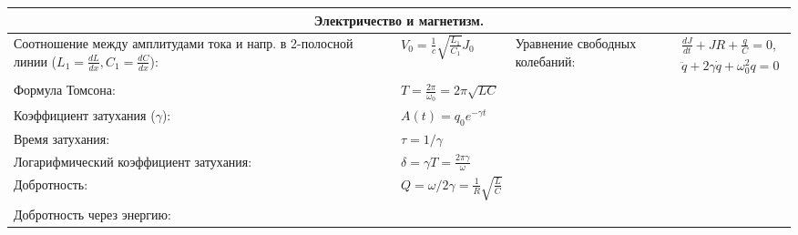 \documentclass{article}
\begin{document}
\begin{tabular}{ |p{6cm}|p{3cm}|p{6cm}|p{3.5cm}|  }
\hline
\multicolumn{4}{|c|}{Электричество и магнетизм.} \\
\hline
Соотношение между амплитудами тока и напр. в 2-полосной линии ($L_1 = \frac{d{L}}{d{x}}, C_1 = \frac{d{C}}{d{x}}$): &
$V_{0}=\frac{1}{c} \sqrt{\frac{L_{1}}{C_{1}}} J_{0}$                       &
Уравнение свободных колебаний:                                             &
$\begin{aligned}
 \frac{d J}{d t}+J R+\frac{q}{C}=0,\\
\ddot{q}+2 \gamma \dot{q}+\omega_{0}^{2} q=0
\end{aligned}$                                                             \\
\hline
Формула Томсона:                                                           &
$T=\frac{2 \pi}{\omega_{0}}=2 \pi \sqrt{L C}$                              &
                                                                           &
                                                                           \\
\hline
Коэффициент затухания ($\gamma$):                                          &
$A(t)=q_{0} e^{-\gamma t}$                                                 &
                                                                           &
                                                                           \\
\hline
Время затухания:                                                           &
$\tau=1 / \gamma$                                                          &
                                                                           &
                                                                           \\
\hline
Логарифмический коэффициент затухания:                                     &
$\delta=\gamma T=\frac{2 \pi \gamma}{\omega}$                              &
                                                                           &
                                                                           \\
\hline
Добротность:                                                               &
$Q=\omega / 2 \gamma = \frac{1}{R} \sqrt{\frac{L}{C}}$                     &
                                                                           &
                                                                           \\
\hline
Добротность через энергию:                                                 &

\end{tabular}
\end{document}
